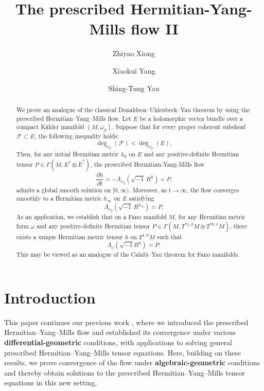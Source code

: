 \documentclass[12pt, reqno]{amsart}
\title{The prescribed Hermitian-Yang-Mills flow II}
\author{Zhiyao Xiong}
\author{Xiaokui Yang}
\author{Shing-Tung Yau}
\newcommand\cF{{\mathcal F}}
\theoremstyle{plain}
\theoremstyle{definition}
\newcommand{\sq}{\sqrt{-1}}
\newcommand{\ts}{\otimes}
\renewcommand{\>}{\rightarrow}
\renewcommand{\>}{\rightarrow}
\newcommand{\om}{\omega}
\numberwithin{equation}{section} %
\begin{document}
    \begin{abstract} We prove an analogue of the classical Donaldson–Uhlenbeck–Yau theorem by using  the prescribed Hermitian–Yang–Mills flow.    Let $E$ be a holomorphic vector bundle over a compact K\"ahler manifold $(M,\om_g)$.
        Suppose that for every proper coherent subsheaf $\cF\subset E$, the following inequality holds:
    $$
        \deg_{\omega_g}(\cF)<\deg_{\omega_g}(E).
    $$
        Then, for any initial Hermitian metric $h_0$ on $E$ and any  positive-definite Hermitian tensor $P\in \Gamma(M,E^*\ts \overline E^*)$, the prescribed Hermitian-Yang-Mills flow
    $$  \ \frac{\partial h}{\partial t} = -\Lambda_{\om_g}\left(\sqrt{-1}\, R^h\right) + P,
    $$
         admits a global smooth solution on $[0,\infty)$. Moreover, as $t\>\infty$, the flow converges smoothly  to a Hermitian metric  $h_\infty$ on $E$ satisfying
    $$
        \Lambda_{\om_g}\left(\sqrt{-1}\, R^{h_\infty}\right) = P.
    $$
As an application,  we establish that on a Fano  manifold $M$,  for any Hermitian metric form $\omega$ and any positive-definite Hermitian  tensor  $P\in\Gamma(M,T^{*1,0}M\ts T^{*0,1}M)$, there exists a unique Hermitian metric tensor  $h$ on $T^{1,0}M$ such that 
$$ \Lambda_\omega\left(\sq R^h\right)=P.$$ This may be viewed as an analogue of the Calabi–Yau theorem for Fano manifolds.

    \end{abstract}


\vspace*{-1\baselineskip} 


\section{Introduction}

This paper continues our previous work \cite{XYY26+}, where we introduced the prescribed Hermitian--Yang--Mills flow
 and established its convergence under various \textbf{differential-geometric} conditions, with applications to solving general prescribed Hermitian--Yang--Mills tensor equations. Here, building on these results, we prove convergence of the flow under \textbf{algebraic-geometric} conditions and thereby obtain solutions to the prescribed Hermitian--Yang--Mills tensor equations in this new setting.
\end{document}
